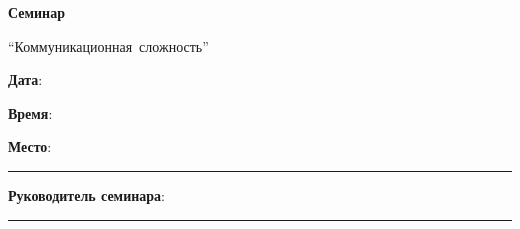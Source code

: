 \begin{center}
	\textbf{
		\fontsize{6.5cm}{0.5cm}\selectfont Семинар
    }

    \fontsize{1cm}{0.5cm}\selectfont ``Коммуникационная~сложность''
\end{center}        
	
	
\huge{
	\textbf{Дата}:

	\textbf{Время}:

	\textbf{Место}:
}
  
\rule{\textwidth}{1pt}

\vspace{0.1cm}

\Large{
	\textbf{Руководитель семинара}:
}

\vspace{0.1cm}

\rule{\textwidth}{1pt}

\vspace{0.1cm}
    
\large{

}
